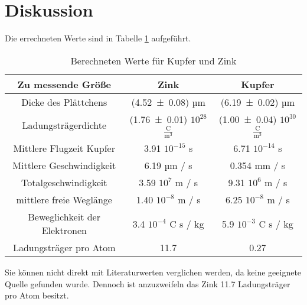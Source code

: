 \section{Diskussion}
\label{sec:Diskussion}
Die errechneten Werte sind in Tabelle \ref{tab:Erg} aufgeführt.
\begin{table}
  \centering
  \begin{tabular}{c|c c}
    \toprule
	Zu messende Größe & Zink & Kupfer \\
    \midrule
	Dicke des Plättchens & (\num{4.52 +- 0.08}) µm & (\num{6.19 +- 0.02}) µm \\
	Ladungsträgerdichte & (\num{1.76 +- 0.01}) $10^{28}$ $\frac{\text{C}}{\text{m}^3}$ & (\num{1.00 +- 0.04}) $10^{30}$ $\frac{\text{C}}{\text{m}^3}$\\
	Mittlere Flugzeit Kupfer & 3.91 \cdot $10^{-15}$ s & 6.71 \cdot $10^{-14}$ s \\
	Mittlere Geschwindigkeit & 6.19 µm / s & 0.354 mm / s \\
	Totalgeschwindigkeit & 3.59 \cdot $10^7$ m / s & 9.31 \cdot $10^6$ m / s\\
	mittlere freie Weglänge & 1.40 \cdot $10^{-8}$ m / s& 6.25 \cdot $10^{-8}$ m / s \\
	Beweglichkeit der Elektronen & 3.4 \cdot $10^{-4}$ C \cdot s / kg & 5.9 \cdot $10^{-3}$ C \cdot s / kg \\
	Ladungsträger pro Atom & 11.7 & 0.27 \\

    \bottomrule
  \end{tabular}
  \caption{Berechneten Werte für Kupfer und Zink}
  \label{tab:Erg}
\end{table}
Sie können nicht direkt mit Literaturwerten verglichen werden, da keine geeignete Quelle gefunden wurde. Dennoch ist anzuzweifeln das Zink 11.7 Ladungsträger pro Atom besitzt. 
